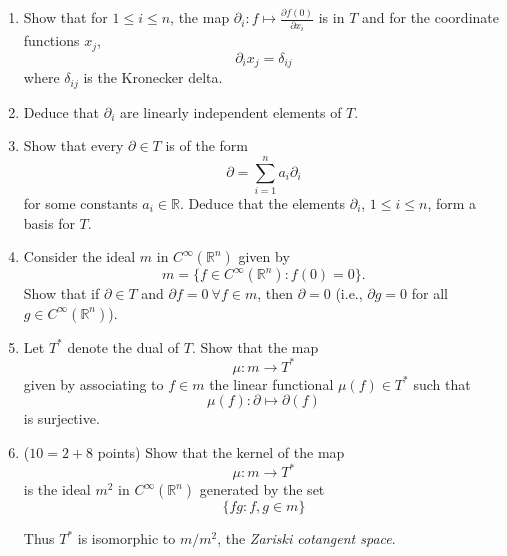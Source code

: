\documentclass[12pt]{article}
\newcommand{\R}{\mathbb{R}}
\newcommand{\del}{\partial}
\begin{document}
\begin{enumerate}
\item Show that for $1\leq i\leq n$, the map $\del_i:f\mapsto \frac{\del f(0)}{\del x_i}$ is in $T$ and for the coordinate functions $x_j$, 
$$\del_i x_j=\delta_{ij}$$
where $\delta_{ij}$ is the Kronecker delta.
\item Deduce that $\del_i$ are linearly independent elements of $T$.
\item Show that every $\del\in T$ is of the form 
$$\del=\sum_{i=1}^n a_i\del_i$$
for some constants $a_i\in\R$. Deduce that the elements $\del_i$, $1\leq i\leq n$, form a basis for $T$.
\item Consider the ideal $m$ in $C^\infty(\R^n)$ given by
$$m=\{f\in C^\infty(\R^n):f(0)=0\}.$$
Show that if $\del\in T$ and $\del f=0\ \forall f\in m$, then $\del=0$ (i.e., $\del g=0$ for all $g\in C^\infty(\R^n)$). 

\item Let $T^*$ denote the dual of $T$. Show that the map 
$$\mu:m\to T^*$$
given by associating to $f\in m$ the linear functional $\mu(f)\in T^*$
such that 
$$\mu(f):\del\mapsto \del(f)$$
is surjective.  

\item ($10=2+8$ points) Show that the kernel of the map 
$$\mu:m\to T^*$$ 
is the ideal $m^2$ in $C^\infty(\R^n)$ generated by the set
$$\{fg:f,g \in m\}$$

 Thus $T^*$ is isomorphic to $m/m^2$, the \emph{Zariski cotangent space}.

\end{enumerate}
\end{document}
